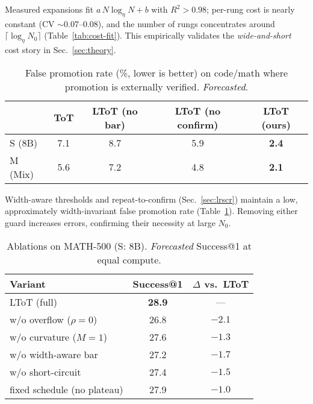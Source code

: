 \documentclass{article}
\begin{document}
Measured expansions fit $a\,N\log_\eta N{+}b$ with $R^2{>}0.98$; per-rung cost is nearly constant (CV $\sim$0.07--0.08), and the number of rungs concentrates around $\lceil\log_\eta N_0\rceil$ (Table~\ref{tab:cost-fit}).
This empirically validates the \emph{wide-and-short} cost story in Sec.~\ref{sec:theory}.

\begin{table}[t]
\centering
\caption{False promotion rate (\%, lower is better) on code/math where promotion is externally verified. \emph{Forecasted}.}
\vspace{0.3em}
\begin{tabular}{lcccc}
\toprule
 & \textbf{ToT} & \textbf{LToT (no bar)} & \textbf{LToT (no confirm)} & \textbf{LToT (ours)} \\
\midrule
S (8B)  & 7.1  & 8.7  & 5.9  & \textbf{2.4} \\
M (Mix) & 5.6  & 7.2  & 4.8  & \textbf{2.1} \\
\bottomrule
\end{tabular}
\label{tab:false-promotions}
\end{table}

Width-aware thresholds and repeat-to-confirm (Sec.~\ref{sec:lrscr}) maintain a low, approximately width-invariant false promotion rate (Table~\ref{tab:false-promotions}).
Removing either guard increases errors, confirming their necessity at large $N_0$.

\begin{table}[t]
\centering
\caption{Ablations on MATH-500 (S: 8B). \emph{Forecasted} Success@1 at equal compute.}
\vspace{0.3em}
\begin{tabular}{lcc}
\toprule
\textbf{Variant} & \textbf{Success@1} & \textbf{$\Delta$ vs.\ LToT} \\
\midrule
LToT (full)                         & \textbf{28.9} & --- \\
\quad w/o overflow ($\rho{=}0$)     & 26.8 & $-2.1$ \\
\quad w/o curvature ($M{=}1$)       & 27.6 & $-1.3$ \\
\quad w/o width-aware bar           & 27.2 & $-1.7$ \\
\quad w/o short-circuit             & 27.4 & $-1.5$ \\
\quad fixed schedule (no plateau)   & 27.9 & $-1.0$ \\
\bottomrule
\end{tabular}
\label{tab:ablations}
\end{table}
\end{document}
